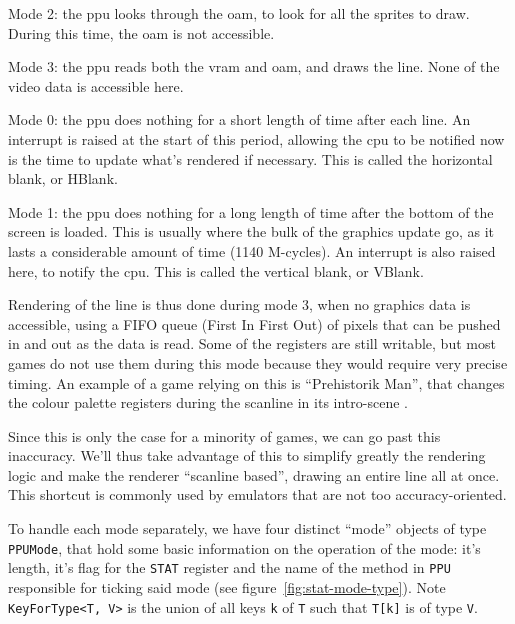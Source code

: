 \documentclass[11pt]{informatics-report}
\begin{document}
\begin{compactitem}
	\item Mode 2: the \gls{ppu} looks through the \gls{oam}, to look for all the sprites to draw. During this time, the \gls{oam} is not accessible.
	\item Mode 3: the \gls{ppu} reads both the \gls{vram} and \gls{oam}, and draws the line. None of the video data is accessible here.
	\item Mode 0: the \gls{ppu} does nothing for a short length of time after each line. An interrupt is raised at the start of this period, allowing the \gls{cpu} to be notified now is the time to update what's rendered if necessary. This is called the horizontal blank, or HBlank.
	\item Mode 1: the \gls{ppu} does nothing for a long length of time after the bottom of the screen is loaded. This is usually where the bulk of the graphics update go, as it lasts a considerable amount of time (1140 M-cycles). An interrupt is also raised here, to notify the \gls{cpu}. This is called the vertical blank, or VBlank.
\end{compactitem}

Rendering of the line is thus done during mode 3, when no graphics data is accessible, using a FIFO queue (First In First Out) of pixels that can be pushed in and out as the data is read. Some of the registers are still writable, but most games do not use them during this mode because they would require very precise timing. An example of a game relying on this is ``Prehistorik Man'', that changes the colour palette registers during the scanline in its intro-scene \cite[Tricky-to-emulate games]{gbdev_wiki}.

Since this is only the case for a minority of games, we can go past this inaccuracy. We'll thus take advantage of this to simplify greatly the rendering logic and make the renderer ``scanline based'', drawing an entire line all at once. This shortcut is commonly used by emulators that are not too accuracy-oriented.

To handle each mode separately, we have four distinct ``mode'' objects of type \texttt{PPUMode}, that hold some basic information on the operation of the mode: it's length, it's flag for the \texttt{STAT} register and the name of the method in \texttt{PPU} responsible for ticking said mode (see figure~\ref{fig:stat-mode-type}). Note \texttt{KeyForType<T, V>} is the union of all keys \texttt{k} of \texttt{T} such that \texttt{T[k]} is of type \texttt{V}.
\end{document}
